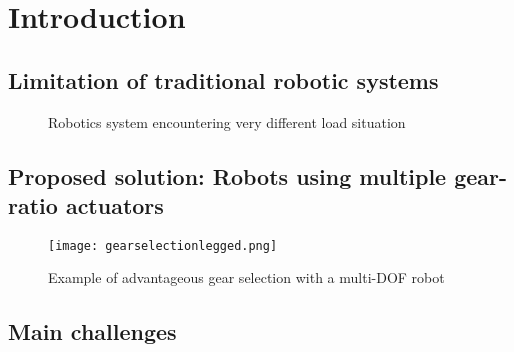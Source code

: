 \chapter{Introduction}
\label{sec:Introduction}



\vspace{+10pt}


\section{Limitation of traditional robotic systems}
\label{sec:limitationOfTraditionnalRoboticSystems}

%
\begin{figure}[H]
				\vspace{-10pt}
        \centering
        \caption{Robotics system encountering very different load situation}
				\label{fig:app}
\end{figure}


\section{Proposed solution: Robots using multiple gear-ratio actuators}
\label{sec:ProposedSolutionRobotsUsingMultipleGearRatioActuators}


\begin{figure}[H]
	\centering
		\texttt{[image: gearselectionlegged.png]}
	\caption{Example of advantageous gear selection with a multi-DOF robot}
	\label{fig:gearselectionlegged}
\end{figure}


\section{Main challenges}
\label{sec:MainChallenges}

